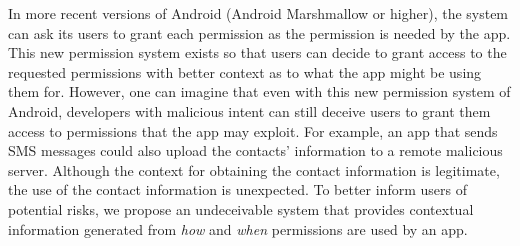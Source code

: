 In more recent versions of Android (Android Marshmallow or higher), the system can ask
its users to grant each permission as the permission is needed by the app.
This new permission system exists so that users can decide to grant access to the
requested permissions with better context as to what the app might be
using them for.
However, one can imagine that even with this new permission system of Android,
developers with malicious intent can still deceive users to grant them access
to permissions that the app may exploit.
For example, an app that sends SMS messages 
could also upload the contacts' information to a remote
malicious server. Although the context for obtaining the
contact information is legitimate, the use of the contact information is unexpected.
To better inform users of potential risks, we propose an undeceivable system that provides
contextual information generated from \emph{how} and \emph{when} permissions are used
by an app.



